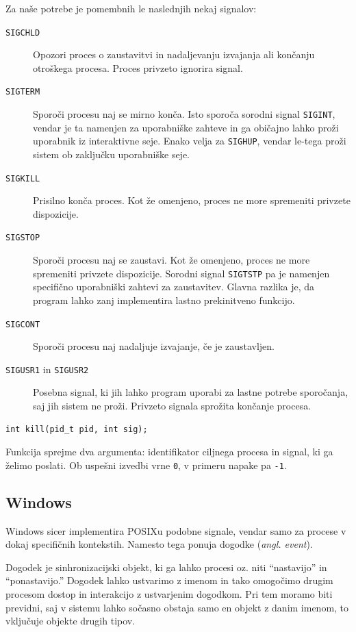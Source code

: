 \documentclass[a4paper,12pt,openright]{book}
\begin{document}
Za naše potrebe je pomembnih le naslednjih nekaj signalov:
\begin{description}
	\item [\texttt{SIGCHLD}] Opozori proces o zaustavitvi in nadaljevanju izvajanja ali končanju otroškega procesa. Proces privzeto ignorira signal.
	\item [\texttt{SIGTERM}] Sporoči procesu naj se mirno konča.
	Isto sporoča sorodni signal \texttt{SIGINT}, vendar je ta namenjen za uporabniške zahteve in ga običajno lahko proži uporabnik iz interaktivne seje.
	Enako velja za \texttt{SIGHUP}, vendar le-tega proži sistem ob zaključku uporabniške seje.
	\item [\texttt{SIGKILL}] Prisilno konča proces. Kot že omenjeno, proces ne more spremeniti privzete dispozicije.
	\item [\texttt{SIGSTOP}] Sporoči procesu naj se zaustavi. Kot že omenjeno, proces ne more spremeniti privzete dispozicije.
	Sorodni signal \texttt{SIGTSTP} pa je namenjen specifično uporabniški zahtevi za zaustavitev. Glavna razlika je, da program lahko zanj implementira lastno prekinitveno funkcijo.
	\item [\texttt{SIGCONT}] Sporoči procesu naj nadaljuje izvajanje, če je zaustavljen.
	\item [\texttt{SIGUSR1} in \texttt{SIGUSR2}] Posebna signal, ki jih lahko program uporabi za lastne potrebe sporočanja, saj jih sistem ne proži.
	Privzeto signala sprožita končanje procesa.
\end{description}

\begin{lstlisting}[style=func]
 int kill(pid_t pid, int sig);
\end{lstlisting}

Funkcija sprejme dva argumenta: identifikator ciljnega procesa in signal, ki ga želimo poslati.
Ob uspešni izvedbi vrne \texttt{0}, v primeru napake pa \texttt{-1}.

\subsection{Windows}

Windows sicer implementira POSIXu podobne signale, vendar samo za procese v dokaj specifičnih kontekstih.
Namesto tega ponuja dogodke (\textit{angl. event}).

Dogodek je sinhronizacijski objekt, ki ga lahko procesi oz. niti ``nastavijo'' in ``ponastavijo.''
Dogodek lahko ustvarimo z imenom in tako omogočimo drugim procesom dostop in interakcijo z ustvarjenim dogodkom.
Pri tem moramo biti previdni, saj v sistemu lahko sočasno obstaja samo en objekt z danim imenom, to vključuje objekte drugih tipov.
\end{document}
